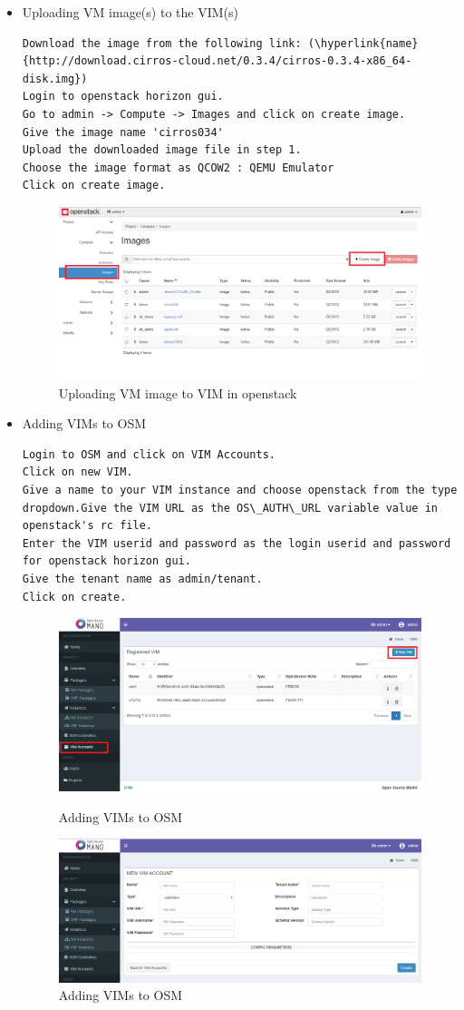 \begin{itemize}
\item Uploading VM image(s) to the VIM(s)
\begin{lstlisting}
Download the image from the following link: (\hyperlink{name}{http://download.cirros-cloud.net/0.3.4/cirros-0.3.4-x86_64-disk.img})
Login to openstack horizon gui.
Go to admin -> Compute -> Images and click on create image.
Give the image name 'cirros034'
Upload the downloaded image file in step 1.
Choose the image format as QCOW2 : QEMU Emulator
Click on create image.
\end{lstlisting}
\begin{figure} [H]
	\centering
	\includegraphics[width=0.5\linewidth]{figures/sh8}
	\caption{Uploading VM image to VIM in openstack}
\end{figure}
\item Adding VIMs to OSM
\begin{lstlisting}
Login to OSM and click on VIM Accounts.
Click on new VIM.
Give a name to your VIM instance and choose openstack from the type dropdown.Give the VIM URL as the OS\_AUTH\_URL variable value in openstack's rc file.
Enter the VIM userid and password as the login userid and password for openstack horizon gui.
Give the tenant name as admin/tenant.
Click on create.
\end{lstlisting}
\begin{figure} [H]
	\centering
	\includegraphics[width=0.5\linewidth]{figures/sh6}
	\caption{Adding VIMs to OSM}
	\includegraphics[width=0.5\linewidth]{figures/sh7}
	\caption{Adding VIMs to OSM}
\end{figure}
\end{itemize}
\newpage
